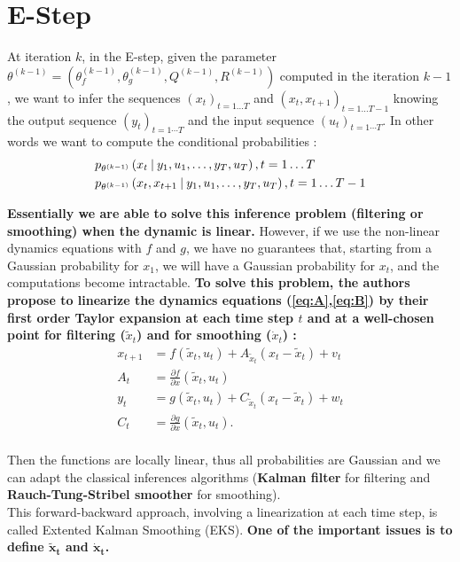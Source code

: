 \section{E-Step}

At iteration $k$, in the E-step, given the parameter $\theta^{(k-1)} = \left( \theta_f^{(k-1)}, \theta_g^{(k-1)}, Q^{(k-1)}, R^{(k-1)} \right)$ computed in the iteration $k-1$, we want to infer the sequences $(x_t)_{t=1 \ldots T}$ and $(x_t, x_{t+1})_{t=1 \ldots T-1}$ knowing the output sequence $(y_t)_{t=1 \cdots T}$ and the input sequence $(u_t)_{t=1 \cdots T}$.
In other words we want to compute the conditional probabilities :
\begin{align*}
  &p_{\theta^{(k-1)}}\left(x_t \mathbin{\vert} y_1, u_1, \ldots, y_T, u_T \right), t=1 \ldots T\\
  &p_{\theta^{(k-1)}}\left(x_t, x_{t+1} \mathbin{\vert} y_1, u_1, \ldots, y_T, u_T \right), t=1 \ldots T-1\\
\end{align*}

\textbf{Essentially we are able to solve this inference problem (filtering or smoothing) when the dynamic is linear.}
However,  if we use the non-linear dynamics equations with $f$ and $g$, we have no guarantees that, starting from a Gaussian probability for $x_1$, we will have a Gaussian probability for $x_{t}$, and the computations become intractable.
\textbf{To solve this problem, the authors propose to linearize the dynamics equations (\ref{eq:A},\ref{eq:B}) by their first order Taylor expansion at each time step $t$ and at a well-chosen point for filtering ($\tilde{x}_t$) and for smoothing ($\dot{x}_t$) :}
\begin{align*}
  x_{t+1} &= f(\tilde{x}_t, u_t) + A_{\tilde{x}_t} (x_t - \tilde{x}_t) + v_t\\
  A_t &= \frac{\partial f}{\partial x}(\tilde{x}_t, u_t)\\
  y_t &= g(\tilde{x}_t, u_t) + C_{\tilde{x}_t} (x_t - \tilde{x}_t) + w_t\\
  C_t &= \frac{\partial g}{\partial x}(\tilde{x}_t, u_t).\\
\end{align*}

Then the functions are locally linear, thus all probabilities are Gaussian and we can adapt the classical inferences algorithms (\textbf{Kalman filter} for filtering and \textbf{Rauch-Tung-Stribel smoother} for smoothing).\\

This forward-backward approach, involving a linearization at each time step, is called Extented Kalman Smoothing (EKS).
\textbf{One of the important issues is to define $\mathbf{\tilde{x}_t}$ and $\mathbf{\dot{x}_t}$.}

